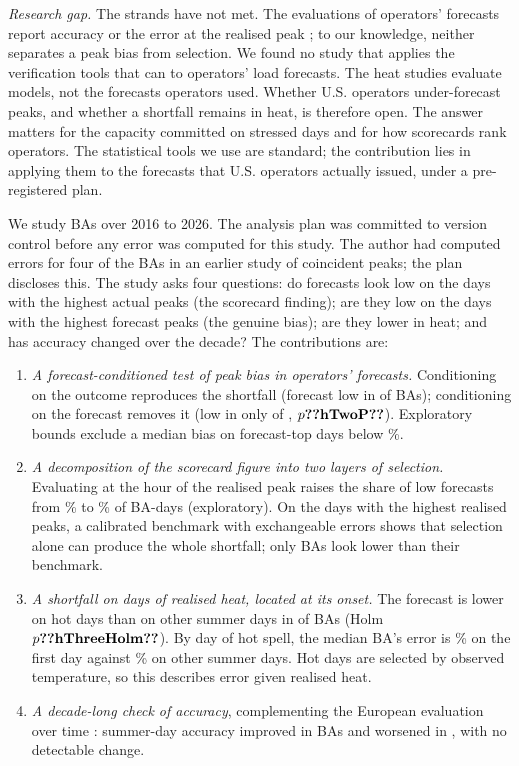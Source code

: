 \documentclass[conference,a4paper]{IEEEtran}
\begin{document}
\emph{Research gap.} The strands have not met. The evaluations of operators' forecasts report accuracy \cite{kazmi2022tso} or the error at the realised peak \cite{cardinalgrid2026}; to our knowledge, neither separates a peak bias from selection. We found no study that applies the verification tools that can \cite{murphy1987framework,lerch2017dilemma} to operators' load forecasts. The heat studies \cite{douglas1998impacts,lu2026heat} evaluate models, not the forecasts operators used. Whether U.S. operators under-forecast peaks, and whether a shortfall remains in heat, is therefore open. The answer matters for the capacity committed on stressed days and for how scorecards rank operators. The statistical tools we use are standard; the contribution lies in applying them to the forecasts that U.S. operators actually issued, under a pre-registered plan.

We study  BAs over 2016 to 2026. The analysis plan was committed to version control before any error was computed for this study. The author had computed errors for four of the BAs in an earlier study of coincident peaks; the plan discloses this. The study asks four questions: do forecasts look low on the days with the highest actual peaks (the scorecard finding); are they low on the days with the highest forecast peaks (the genuine bias); are they lower in heat; and has accuracy changed over the decade? The contributions are:
\begin{enumerate}
\item \emph{A forecast-conditioned test of peak bias in operators' forecasts.} Conditioning on the outcome reproduces the shortfall (forecast low in  of  BAs); conditioning on the forecast removes it (low in only  of , $p\res{hTwoP}$). Exploratory bounds exclude a median bias on forecast-top days below \%.
\item \emph{A decomposition of the scorecard figure into two layers of selection.} Evaluating at the hour of the realised peak raises the share of low forecasts from \% to \% of BA-days (exploratory). On the days with the highest realised peaks, a calibrated benchmark with exchangeable errors shows that selection alone can produce the whole shortfall; only  BAs look lower than their benchmark.
\item \emph{A shortfall on days of realised heat, located at its onset.} The forecast is lower on hot days than on other summer days in  of  BAs (Holm $p\res{hThreeHolm}$). By day of hot spell, the median BA's error is \% on the first day against \% on other summer days. Hot days are selected by observed temperature, so this describes error given realised heat.
\item \emph{A decade-long check of accuracy}, complementing the European evaluation over time \cite{kazmi2022tso}: summer-day accuracy improved in  BAs and worsened in , with no detectable change.
\end{enumerate}
\end{document}

